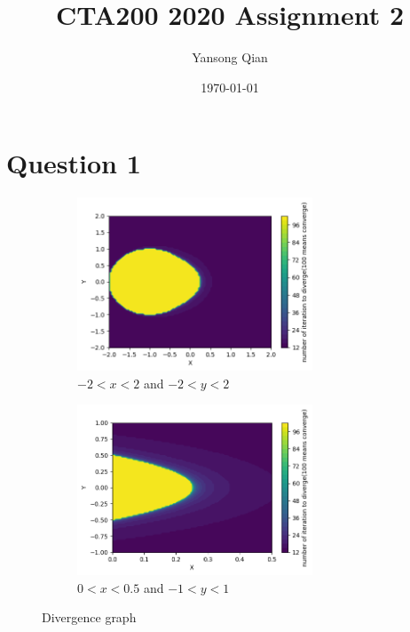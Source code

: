 \documentclass{article}
\title{CTA200 2020 Assignment 2}
\author{Yansong Qian}
\date{\today}
\begin{document}
\maketitle

\section*{Question 1}

\begin{figure}[H]
    
    \begin{subfigure}{7cm}
    \centering
    \includegraphics[width=7cm]{1.1.png}
    \caption{$-2 < x < 2$ and $-2 < y < 2$}
    \label{fig:my_label}
     \end{subfigure}
     \begin{subfigure}{7cm}
    \centering
    \includegraphics[width=7cm]{1.2.png}
    \caption{$0 < x < 0.5$ and $-1 < y < 1$}
    \label{fig:my_label}
     \end{subfigure}
     \caption{Divergence graph}
\end{figure}
\end{document}
